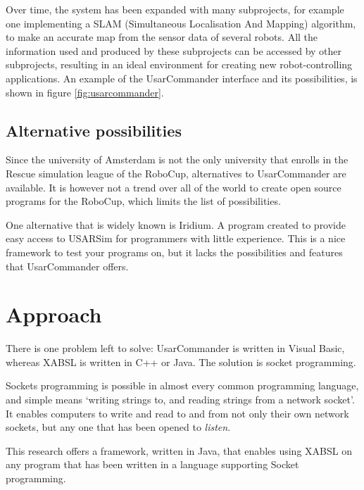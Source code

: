 \documentclass[a4paper,10pt]{article}
\begin{document}
Over time, the system has been expanded with many subprojects, for example one
implementing a SLAM
(Simultaneous Localisation And Mapping) algorithm, to make an accurate map from
the sensor data of several robots\cite{slamet2006manifoldslam}. All the information used and produced by
these subprojects can be accessed by other subprojects, resulting in an ideal
environment for creating new robot-controlling applications.
An example of the UsarCommander interface and its possibilities, is shown in
figure \ref{fig:usarcommander}.

\subsection{Alternative possibilities}
Since the university of Amsterdam is not the only university that enrolls in the
Rescue simulation league of the RoboCup, alternatives to UsarCommander are
available. It is however not a trend over all of the world to create open source
programs for the RoboCup, which limits the list of possibilities.

One alternative that is widely known is Iridium. A program created to provide
easy access to USARSim for programmers with little experience. This is a nice
framework to test your programs on, but it lacks the possibilities and features that
UsarCommander offers. 

\section{Approach}
There is one problem left to solve: UsarCommander is written in Visual Basic,
whereas XABSL is written in C++ or Java. The solution is socket programming.

Sockets programming is possible in almost every common programming language, and
simple means `writing strings to, and reading strings from a network socket'.
It enables computers to write and read to and from not only their own network
sockets, but any one that has been opened to \textit{listen}. 

This research offers a framework, written in Java, that enables using XABSL on
any program that has been written in a language supporting Socket programming.
\end{document}
